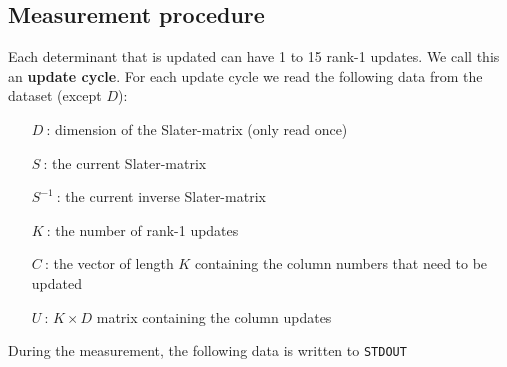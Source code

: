 \documentclass[11pt]{article}
\numberwithin{figure}{section}
\numberwithin{table}{section}
\begin{document}
		\subsection{Measurement procedure}
			Each determinant that is updated can have 1 to 15 rank-1 updates. We call this an \textbf{update cycle}. For each update cycle we read the following data from the dataset (except $D$):
			\begin{itemize}
				\item [$D\:$:] dimension of the Slater-matrix (only read once)
				\item [$S\:$:] the current Slater-matrix
				\item [$S^{-1}\:$:] the current inverse Slater-matrix
				\item [$K\:$:] the number of rank-1 updates
				\item [$C\:$:] the vector of length $K$ containing the column numbers that need to be updated
				\item [$U\:$:] $K\times D$ matrix containing the column updates
			\end{itemize}
			During the measurement, the following data is written to \verb|STDOUT|
\end{document}
